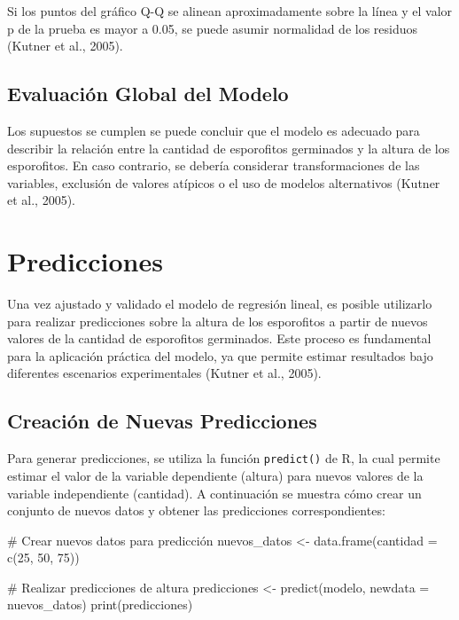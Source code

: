 \documentclass[
  spanish,
  a4paper,
  DIV=11,
  numbers=noendperiod,
  onepage,
  openany]{scrreprt}
\newenvironment{Shaded}{\begin{snugshade}}{\end{snugshade}}
\newcommand{\AttributeTok}[1]{\textcolor[rgb]{0.40,0.45,0.13}{#1}}
\newcommand{\CommentTok}[1]{\textcolor[rgb]{0.37,0.37,0.37}{#1}}
\newcommand{\DecValTok}[1]{\textcolor[rgb]{0.68,0.00,0.00}{#1}}
\newcommand{\FunctionTok}[1]{\textcolor[rgb]{0.28,0.35,0.67}{#1}}
\newcommand{\NormalTok}[1]{\textcolor[rgb]{0.00,0.23,0.31}{#1}}
\newcommand{\OtherTok}[1]{\textcolor[rgb]{0.00,0.23,0.31}{#1}}
\begin{document}
Si los puntos del gráfico Q-Q se alinean aproximadamente sobre la línea
y el valor p de la prueba es mayor a 0.05, se puede asumir normalidad de
los residuos (Kutner et al., 2005).

\subsection{Evaluación Global del
Modelo}\label{evaluaciuxf3n-global-del-modelo}

Los supuestos se cumplen se puede concluir que el modelo es adecuado
para describir la relación entre la cantidad de esporofitos germinados y
la altura de los esporofitos. En caso contrario, se debería considerar
transformaciones de las variables, exclusión de valores atípicos o el
uso de modelos alternativos (Kutner et al., 2005).

\section{Predicciones}\label{predicciones}

Una vez ajustado y validado el modelo de regresión lineal, es posible
utilizarlo para realizar predicciones sobre la altura de los esporofitos
a partir de nuevos valores de la cantidad de esporofitos germinados.
Este proceso es fundamental para la aplicación práctica del modelo, ya
que permite estimar resultados bajo diferentes escenarios experimentales
(Kutner et al., 2005).

\subsection{Creación de Nuevas
Predicciones}\label{creaciuxf3n-de-nuevas-predicciones}

Para generar predicciones, se utiliza la función \texttt{predict()} de
R, la cual permite estimar el valor de la variable dependiente (altura)
para nuevos valores de la variable independiente (cantidad). A
continuación se muestra cómo crear un conjunto de nuevos datos y obtener
las predicciones correspondientes:

\begin{Shaded}
\begin{Highlighting}[]
\CommentTok{\# Crear nuevos datos para predicción}
\NormalTok{nuevos\_datos }\OtherTok{\textless{}{-}} \FunctionTok{data.frame}\NormalTok{(}\AttributeTok{cantidad =} \FunctionTok{c}\NormalTok{(}\DecValTok{25}\NormalTok{, }\DecValTok{50}\NormalTok{, }\DecValTok{75}\NormalTok{))}

\CommentTok{\# Realizar predicciones de altura}
\NormalTok{predicciones }\OtherTok{\textless{}{-}} \FunctionTok{predict}\NormalTok{(modelo, }\AttributeTok{newdata =}\NormalTok{ nuevos\_datos)}
\FunctionTok{print}\NormalTok{(predicciones)}
\end{Highlighting}
\end{Shaded}
\end{document}
